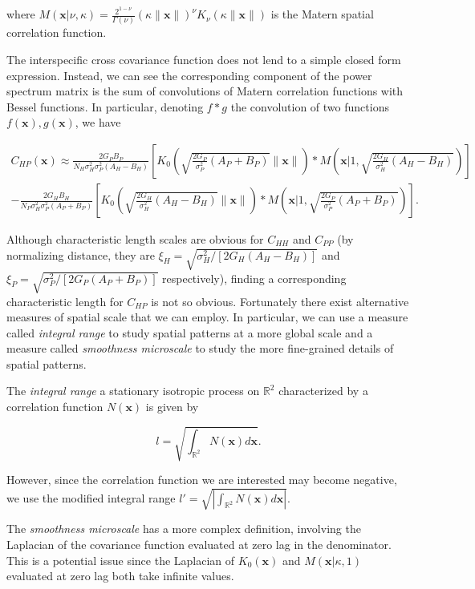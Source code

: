 \documentclass{article}
\begin{document}
where
\(M(\pmb x|\nu,\kappa)=\frac{2^{1-\nu}}{\Gamma(\nu)}(\kappa\|\pmb x\|)^\nu K_\nu(\kappa\|\pmb x\|)\)
is the Matern spatial correlation function.

The interspecific cross covariance function does not lend to a simple
closed form expression. Instead, we can see the corresponding component
of the power spectrum matrix is the sum of convolutions of Matern
correlation functions with Bessel functions. In particular, denoting
\(f*g\) the convolution of two functions \(f(\pmb x),g(\pmb x)\), we
have

\begin{multline}
  C_{HP}(\pmb x) \approx \frac{2G_PB_P}{N_H\sigma^2_H\sigma^2_P(A_H-B_H)}\left[K_0\left(\sqrt{\frac{2G_P}{\sigma^2_P}(A_P+B_P)}\|\pmb x\|\right) * M\left(\pmb x\Big|1,\sqrt{\frac{2G_H}{\sigma^2_H}(A_H-B_H)}\right)\right] \\ - \frac{2G_HB_H}{N_P\sigma^2_H\sigma^2_P(A_P+B_P)}\left[K_0\left(\sqrt{\frac{2G_H}{\sigma^2_H}(A_H-B_H)}\|\pmb x\|\right)*M\left(\pmb x\Big|1,\sqrt{\frac{2G_P}{\sigma^2_P}(A_P+B_P)}\right)\right].
\end{multline}

Although characteristic length scales are obvious for \(C_{HH}\) and
\(C_{PP}\) (by normalizing distance, they are
\(\xi_H=\sqrt{\sigma^2_H/[2G_H(A_H-B_H)]}\) and
\(\xi_P=\sqrt{\sigma^2_P/[2G_P(A_P+B_P)]}\) respectively), finding a
corresponding characteristic length for \(C_{HP}\) is not so obvious.
Fortunately there exist alternative measures of spatial scale that we
can employ. In particular, we can use a measure called \emph{integral
range} to study spatial patterns at a more global scale and a measure
called \emph{smoothness microscale} to study the more fine-grained
details of spatial patterns.

The \emph{integral range} a stationary isotropic process on
\(\mathbb R^2\) characterized by a correlation function \(N(\pmb x)\) is
given by

\[l=\sqrt{\int_{\mathbb R^2}N(\pmb x)d\pmb x}.\]

However, since the correlation function we are interested may become
negative, we use the modified integral range
\(l'=\sqrt{\left|\int_{\mathbb R^2}N(\pmb x)d\pmb x\right|}\).

The \emph{smoothness microscale} has a more complex definition,
involving the Laplacian of the covariance function evaluated at zero lag
in the denominator. This is a potential issue since the Laplacian of
\(K_0(\pmb x)\) and \(M(\pmb x|\kappa,1)\) evaluated at zero lag both
take infinite values.
\end{document}

